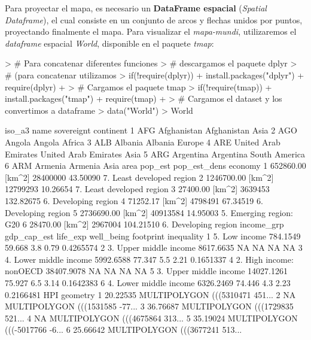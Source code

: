 \documentclass [a4paper] {article}
\begin{document}
Para proyectar el mapa, es necesario un \textbf{DataFrame espacial} (\textit{Spatial Dataframe}), el cual consiste en un conjunto de arcos y flechas unidos por puntos, proyectando finalmente el mapa. Para visualizar el \textit{mapa-mundi}, utilizaremos el \textit{dataframe} espacial \textit{World}, disponible en el paquete \textit{tmap}:
{\footnotesize
\begin{Schunk}
\begin{Sinput}
> # Para concatenar diferentes funciones
> # descargamos el paquete dplyr 
> # (para concatenar utilizamos %>%)
> if(!require(dplyr)){
+   install.packages("dplyr")
+   require(dplyr)
+ }
> # Cargamos el paquete tmap
> if(!require(tmap)){
+   install.packages("tmap")
+   require(tmap)
+ }
> # Cargamos el dataset y los convertimos a dataframe
> data("World")
> World %>% as.data.frame() %>% head()
\end{Sinput}
\begin{Soutput}
  iso_a3                 name           sovereignt     continent
1    AFG          Afghanistan          Afghanistan          Asia
2    AGO               Angola               Angola        Africa
3    ALB              Albania              Albania        Europe
4    ARE United Arab Emirates United Arab Emirates          Asia
5    ARG            Argentina            Argentina South America
6    ARM              Armenia              Armenia          Asia
               area  pop_est pop_est_dens                   economy
1  652860.00 [km^2] 28400000     43.50090 7. Least developed region
2 1246700.00 [km^2] 12799293     10.26654 7. Least developed region
3   27400.00 [km^2]  3639453    132.82675      6. Developing region
4   71252.17 [km^2]  4798491     67.34519      6. Developing region
5 2736690.00 [km^2] 40913584     14.95003   5. Emerging region: G20
6   28470.00 [km^2]  2967004    104.21510      6. Developing region
               income_grp gdp_cap_est life_exp well_being footprint inequality
1           5. Low income    784.1549   59.668        3.8      0.79  0.4265574
2  3. Upper middle income   8617.6635       NA         NA        NA         NA
3  4. Lower middle income   5992.6588   77.347        5.5      2.21  0.1651337
4 2. High income: nonOECD  38407.9078       NA         NA        NA         NA
5  3. Upper middle income  14027.1261   75.927        6.5      3.14  0.1642383
6  4. Lower middle income   6326.2469   74.446        4.3      2.23  0.2166481
       HPI                       geometry
1 20.22535 MULTIPOLYGON (((5310471 451...
2       NA MULTIPOLYGON (((1531585 -77...
3 36.76687 MULTIPOLYGON (((1729835 521...
4       NA MULTIPOLYGON (((4675864 313...
5 35.19024 MULTIPOLYGON (((-5017766 -6...
6 25.66642 MULTIPOLYGON (((3677241 513...
\end{Soutput}
\end{Schunk}
}
\end{document}
